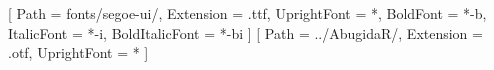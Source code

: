 \setmainfont{segoe-ui}[
    Path = fonts/segoe-ui/,
    Extension = .ttf,
    UprightFont = *,
    BoldFont = *-b,
    ItalicFont = *-i,
    BoldItalicFont = *-bi
]
\newfontfamily{}[
    Path = ../AbugidaR/,
    Extension = .otf,
    UprightFont = *
]
\makeglossaries
